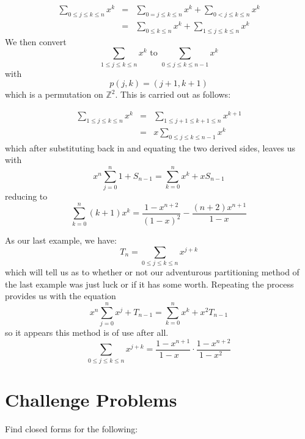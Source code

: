 \documentclass[twoside]{article}
\begin{document}
\begin{eqnarray*}
\sum_{0\le j\le k\le n}\!\!\!\!\! x^k      
 & = & \sum_{0=j\le k\le n}\!\!\!\!\! x^k   
 +\sum_{0<j\le k\le n}\!\!\!\!\! x^k      \\
 & = & \sum_{0\le k\le n}\!\!\! x^k        
 +\sum_{1\le j\le k\le n}\!\!\!\!\! x^k    
\end{eqnarray*} We then convert
$$  \sum_{1\le j\le k\le n}\!\!\!\!\! x^k
\mbox{\ \ \ to\ \ \ }\sum_{0\le j\le k\le n-1}\!\!\!\!\!\!\!\! x^k  $$ 
with $$  p(j,k)=(j+1,k+1)  $$ which is a permutation on $  \mathbb{Z}^2  $.
This is carried out as follows:

\begin{eqnarray*}
\sum_{1\le j\le k\le n}\!\!\!\!\! x^k 
 & = & \sum_{1\le j+1\le k+1\le n}\!\!\!\!\!\!\!\!\!\!\! x^{k+1}        \\
 & = & x\!\!\!\!\!\!\!\!\!\sum_{0\le j\le k\le n-1}\!\!\!\!\!\!\!\! x^k
\end{eqnarray*} which after substituting back in and equating
the two derived sides, leaves us with
$$  x^n\sum_{j=0}^n1+S_{n-1}=\sum_{k=0}^nx^k+xS_{n-1}  $$
reducing to
$$  \sum_{k=0}^n(k+1)x^k=\frac{1-x^{n+2}}{(1-x)^2}
-\frac{(n+2)x^{n+1}}{1-x^{}}  $$

As our last example, we have:
$$  T_n=\sum_{0\le j\le k\le n}\!\!\!\!\! x^{j+k}  $$
which will tell us as to whether or not our  adventurous 
partitioning method of the last example was just luck or if it has 
some worth.  Repeating the process provides us with the equation
$$  x^n\sum_{j=0}^nx^j+T_{n-1}=\sum_{k=0}^nx^k+x^2T_{n-1}  $$
so it appears this method is of use after all.
$$  \sum_{0\le j\le k\le n}\!\!\!\!\! x^{j+k}
=\frac{1-x^{n+1}}{1-x^{}\ \ \ \ }\cdot\frac{1-x^{n+2}}{1-x^2\ \ \ }  $$

\newpage

\section{Challenge Problems}
Find closed forms for the following:
\end{document}
